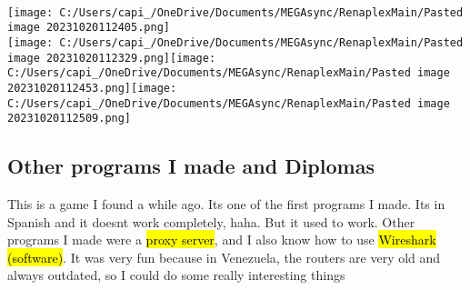 \documentclass[
]{article}
\begin{document}
\textquotesingle\textquotesingle\textquotesingle{}\\
\texttt{[image: C:/Users/capi\_/OneDrive/Documents/MEGAsync/RenaplexMain/Pasted image 20231020112405.png]}\\
\texttt{[image: C:/Users/capi\_/OneDrive/Documents/MEGAsync/RenaplexMain/Pasted image 20231020112329.png]}\texttt{[image: C:/Users/capi\_/OneDrive/Documents/MEGAsync/RenaplexMain/Pasted image 20231020112453.png]}\texttt{[image: C:/Users/capi\_/OneDrive/Documents/MEGAsync/RenaplexMain/Pasted image 20231020112509.png]}

\subsection{Other programs I made and
Diplomas}\label{other-programs-i-made-and-diplomas}

This is a game I found a while ago. It\textquotesingle s one of the
first programs I made. It\textquotesingle s in Spanish and it
doesn\textquotesingle t work completely, haha. But it used to work.
Other programs I made were a \hl{proxy server}, and I also know how to
use \hl{Wireshark (software)}. It was very fun because in Venezuela, the
routers are very old and always outdated, so I could do some really
interesting things
\end{document}

